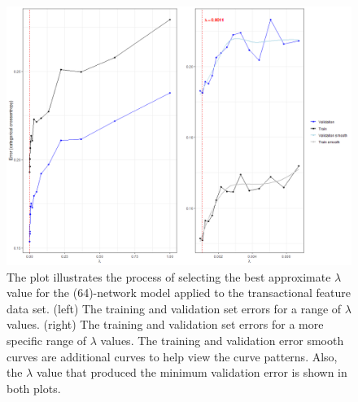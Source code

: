 \begin{figure}[]
	\begin{center}
		\includegraphics[scale = 0.5]{fig/CH3/trans_mod_2_lambda_plot.png}
		\caption{The plot illustrates the process of selecting the best approximate $\lambda$ value for the (64)-network model applied to the transactional feature data set. (left) The training and validation set errors for a range of $\lambda$ values. (right) The training and validation set errors for a more specific range of $\lambda$ values. The training and validation error smooth curves are additional curves to help view the curve patterns. Also, the $\lambda$ value that produced the minimum validation error is shown in both plots.}
		\label{fig:ch3_nn_validation_mod2_trans}
	\end{center}	
\end{figure}

